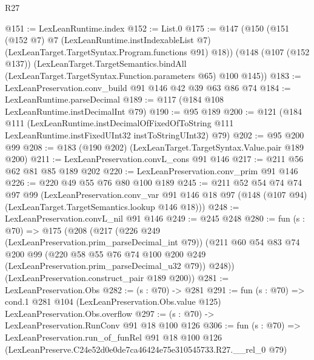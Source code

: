 \begin{lexlean}{R27}
\begin{coremodule}
@151 := LexLeanRuntime.index
@152 := List.{0}
@175 := @147
    (@150
      (@151
        (@152 @7)
        @7
        (LexLeanRuntime.instIndexableList @7)
        (LexLeanTarget.TargetSyntax.Program.functions @91)
        @18))
    (@148
      (@107 (@152 @137))
      (LexLeanTarget.TargetSemantics.bindAll
        (LexLeanTarget.TargetSyntax.Function.parameters @65)
        @100
        @145))
@183 := LexLeanPreservation.conv_build @91 @146 @42 @39 @63 @86 @74
@184 := LexLeanRuntime.parseDecimal
@189 := @117 (@184 @108 LexLeanRuntime.instDecimalInt @79)
@190 := @95 @189
@200 := @121
    (@184
      @111
      (LexLeanRuntime.instDecimalOfFixedOfToString
        @111
        LexLeanRuntime.instFixedUInt32
        instToStringUInt32)
      @79)
@202 := @95 @200 @99
@208 := @183 (@190 @202) (LexLeanTarget.TargetSyntax.Value.pair @189 @200)
@211 := LexLeanPreservation.convL_cons @91 @146
@217 := @211 @56 @62 @81 @85 @189 @202
@220 := LexLeanPreservation.conv_prim @91 @146
@226 := @220 @49 @55 @76 @80 @100 @189
@245 := @211
    @52
    @54
    @74
    @74
    @97
    @99
    (LexLeanPreservation.conv_var
      @91
      @146
      @18
      @97
      (@148 (@107 @94) (LexLeanTarget.TargetSemantics.lookup @146 @18)))
@248 := LexLeanPreservation.convL_nil @91 @146
@249 := @245 @248
@280 := fun (s : @70) =>
  @175
    (@208
      (@217
        (@226 @249 (LexLeanPreservation.prim_parseDecimal_int @79))
        (@211
          @60
          @54
          @83
          @74
          @200
          @99
          (@220 @58 @55 @76 @74 @100 @200 @249 (LexLeanPreservation.prim_parseDecimal_u32 @79))
          @248))
      (LexLeanPreservation.construct_pair @189 @200))
@281 := LexLeanPreservation.Obs
@282 := (s : @70) -> @281
@291 := fun (s : @70) =>
  cond.{1} @281 @104 (LexLeanPreservation.Obs.value @125) LexLeanPreservation.Obs.overflow
@297 := (s : @70) -> LexLeanPreservation.RunConv @91 @18 @100 @126
@306 := fun (s : @70) =>
  LexLeanPreservation.run_of_funRel
    @91
    @18
    @100
    @126
    (LexLeanPreserve.C24e52d0e0de7ca46424e75e310545733.R27.__rel_0 @79)
\end{coremodule}
\end{lexlean}
